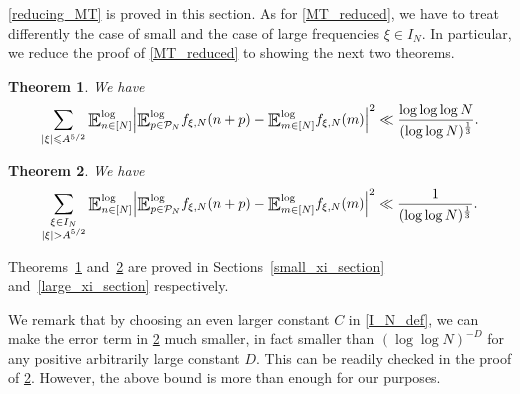 \documentclass[letter,11pt]{article}
\theoremstyle{plain} %
\newtheorem{theorem}{Theorem}[section]
\theoremstyle{definition} %
\theoremstyle{plain}
\theoremstyle{plain}
\theoremstyle{plain}
\numberwithin{equation}{section}
\renewcommand{\leq}{\leqslant}
\newcommand{\E}{\raisebox{-0.4ex}{\scalebox{1.4}[1.3]{$\mathbb{E}$}}}
\newcommand{\logE}{{\E}^{\log}}
\newcommand{\1}{\mathbbm{1}}
\newcommand{\f}{f_{\xi,N}}
\newcommand{\Pc}{\mathcal{P}}
\begin{document}
\cref{reducing_MT} is proved in this section. As for \cref{MT_reduced}, we have to treat differently the case of small and the case of large frequencies $\xi\in I_N$. In particular, we reduce the proof of \cref{MT_reduced} to showing the next two theorems.

\begin{theorem}\label{small_xi_thm}
We have
\begin{equation*}
    \sum_{|\xi|\leq A^{5/2}}
    \logE_{n\in[N]}\Big|\logE_{p\in\Pc_N}\f(n+p) - \logE_{m\in[N]} \f(m)\Big|^2 
    \ll
    \frac{\log\log\log{N}}{(\log\log{N})^\frac{1}{3}}.
\end{equation*}
\end{theorem}

\begin{theorem}\label{large_xi_thm}
We have
\begin{equation*}\label{large_xi_eq}
    \sum_{\substack{\xi\in I_N \\ |\xi|>A^{5/2}}}
    \logE_{n\in[N]}\Big|\logE_{p\in\Pc_N}\f(n+p) - \logE_{m\in[N]} \f(m)\Big|^2 
    \ll \frac{1}{(\log\log{N})^\frac{1}{3}}.
\end{equation*}
\end{theorem}

Theorems~\ref{small_xi_thm} and~\ref{large_xi_thm} are proved in Sections~\ref{small_xi_section} and~\ref{large_xi_section} respectively.

We remark that by choosing an even larger constant $C$ in \eqref{I_N_def}, we can make the error term in \cref{large_xi_thm} much smaller, in fact smaller than $(\log\log{N})^{-D}$ for any positive arbitrarily large constant $D$. This can be readily checked in the proof of \cref{large_xi_thm}. However, the above bound is more than enough for our purposes.
\end{document}
